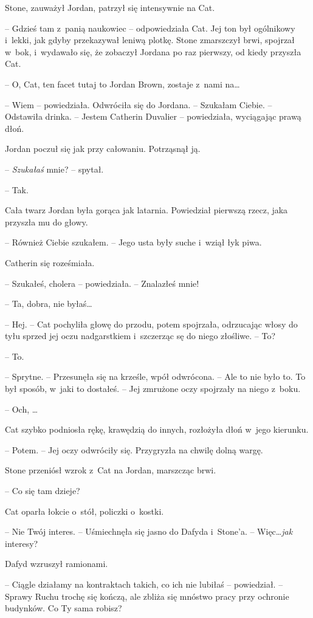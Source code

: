 \documentclass[oneside,polish,11pt,sfheadings]{mwbk}
\begin{document}
Stone, zauważył Jordan, patrzył się intensywnie na Cat.

-- Gdzieś tam z~panią naukowiec -- odpowiedziała Cat. Jej ton był
ogólnikowy i~lekki, jak gdyby przekazywał leniwą plotkę. Stone
zmarszczył brwi, spojrzał w~bok, i~wydawało się, że zobaczył Jordana po
raz pierwszy, od kiedy przyszła Cat.

-- O, Cat, ten facet tutaj to Jordan Brown, zostaje z~nami na\ldots

-- Wiem -- powiedziała. Odwróciła się do Jordana. -- Szukałam Ciebie. -- Odstawiła drinka. -- Jestem Catherin Duvalier -- powiedziała, wyciągając
prawą dłoń.

Jordan poczuł się jak przy całowaniu. Potrząsnął ją.

-- \emph{Szukałaś} mnie? -- spytał.

-- Tak.

Cała twarz Jordan była gorąca jak latarnia. Powiedział pierwszą rzecz,
jaka przyszła mu do głowy. 

-- Również Ciebie szukałem. -- Jego usta były
suche i~wziął łyk piwa.

Catherin się roześmiała. 

-- Szukałeś, cholera -- powiedziała. -- Znalazłeś
mnie!

-- Ta, dobra, nie byłaś\ldots

-- Hej. -- Cat pochyliła głowę do przodu, potem spojrzała, odrzucając
włosy do tyłu sprzed jej oczu nadgarstkiem i~szczerząc sę do niego
złośliwe. -- To?

-- To.

-- Sprytne. -- Przesunęła się na krześle, wpół odwrócona. -- Ale to nie
było to. To był sposób, w~jaki to dostałeś. -- Jej zmrużone oczy
spojrzały na niego z~boku.

-- Och, \ldots

Cat szybko podniosła rękę, krawędzią do innych, rozłożyła dłoń w~jego kierunku. 

-- Potem. -- Jej oczy odwróciły się. Przygryzła na chwilę
dolną wargę.

Stone przeniósł wzrok z~Cat na Jordan, marszcząc brwi. 

-- Co się tam
dzieje?

Cat oparła łokcie o~stół, policzki o~kostki. 

-- Nie Twój interes. -- Uśmiechnęła się jasno do Dafyda i~Stone'a. -- Więc\ldots \emph{jak}
interesy?

Dafyd wzruszył ramionami. 

-- Ciągle działamy na kontraktach takich, co
ich nie lubiłaś -- powiedział. -- Sprawy Ruchu trochę się kończą, ale
zbliża się mnóstwo pracy przy ochronie budynków. Co Ty sama robisz?
\end{document}
